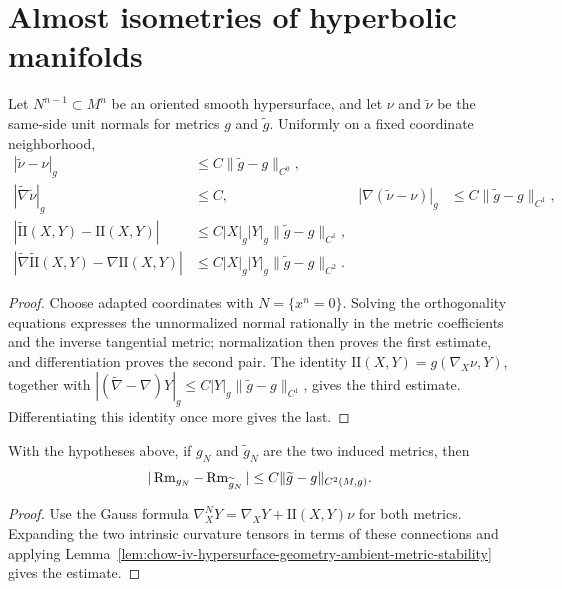 \section{Almost isometries of hyperbolic manifolds}

\begin{lemma}
\label{lem:chow-iv-hypersurface-geometry-ambient-metric-stability}

Let \(N^{n-1}\subset M^n\) be an oriented smooth hypersurface, and let \(\nu\)
and \(\widetilde\nu\) be the same-side unit normals for metrics \(g\) and
\(\widetilde g\).  Uniformly on a fixed coordinate neighborhood,
\begin{align*}
 |\widetilde\nu-\nu|_g&\le C\|\widetilde g-g\|_{C^0},\\
 |\widetilde\nabla\widetilde\nu|_g&\le C,
 &|\nabla(\widetilde\nu-\nu)|_g&\le C\|\widetilde g-g\|_{C^1},\\
 |\widetilde{\mathrm{II}}(X,Y)-\mathrm{II}(X,Y)|
 &\le C|X|_g|Y|_g\|\widetilde g-g\|_{C^1},\\
 |\widetilde\nabla\widetilde{\mathrm{II}}(X,Y)-\nabla\mathrm{II}(X,Y)|
 &\le C|X|_g|Y|_g\|\widetilde g-g\|_{C^2}.
\end{align*}
\end{lemma}
\begin{proof}
\sketch
Choose adapted coordinates with \(N=\{x^n=0\}\).  Solving the orthogonality
equations expresses the unnormalized normal rationally in the metric
coefficients and the inverse tangential metric; normalization then proves the
first estimate, and differentiation proves the second pair.  The identity
\(\mathrm{II}(X,Y)=g(\nabla_X\nu,Y)\), together with
\(|(\widetilde\nabla-\nabla)Y|_g\le C|Y|_g\|\widetilde g-g\|_{C^1}\), gives
the third estimate.  Differentiating this identity once more gives the last.
\end{proof}

\begin{lemma}
\label{lem:chow-iv-hypersurface-intrinsic-curvature-stability}


With the hypotheses above, if \(g_N\) and \(\widetilde g_N\) are the two induced
metrics, then
\[
 |\operatorname{Rm}_{g_N}-\operatorname{Rm}_{\widetilde g_N}|
 \le C\|\widetilde g-g\|_{C^2(M,g)}.
\]
\end{lemma}
\begin{proof}
\sketch
Use the Gauss formula
\(\nabla^N_XY=\nabla_XY+\mathrm{II}(X,Y)\nu\) for both metrics.  Expanding the
two intrinsic curvature tensors in terms of these connections and applying
Lemma~\ref{lem:chow-iv-hypersurface-geometry-ambient-metric-stability} gives
the estimate.
\end{proof}

